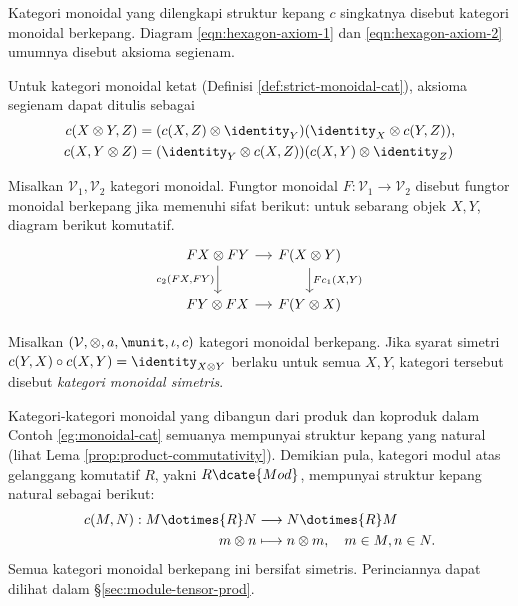 Kategori monoidal yang dilengkapi struktur kepang $c$ singkatnya disebut kategori monoidal berkepang. Diagram \eqref{eqn:hexagon-axiom-1} dan \eqref{eqn:hexagon-axiom-2} umumnya disebut aksioma segienam.
\begin{remark}\label{rem:hexagon-axiom-strict}
	Untuk kategori monoidal ketat (Definisi \ref{def:strict-monoidal-cat}), aksioma segienam dapat ditulis sebagai
	\begin{align*}
		c(X \otimes Y, Z) & = (c(X, Z) \otimes \identity_Y) (\identity_X \otimes c(Y, Z)), \\
		c(X, Y \otimes Z) & = (\identity_Y \otimes c(X, Z)) (c(X, Y) \otimes \identity_Z)
	\end{align*}
\end{remark}

\begin{definition}
	Misalkan $\mathcal{V}_1, \mathcal{V}_2$ kategori monoidal. Fungtor monoidal $F: \mathcal{V}_1 \to \mathcal{V}_2$ disebut fungtor monoidal berkepang jika memenuhi sifat berikut: untuk sebarang objek $X, Y$, diagram berikut komutatif.
	\[ \begin{tikzcd}[column sep=small]
		FX \otimes FY \arrow[r] \arrow[d, "{c_2(FX, FY)}"'] & F(X \otimes Y) \arrow[d, "{Fc_1(X, Y)}"] \\
		FY \otimes FX \arrow[r] & F(Y \otimes X)
	\end{tikzcd} \]
\end{definition}

\begin{definition}\label{def:symm-monoidal-cat}
	Misalkan $(\mathcal{V}, \otimes, a, \munit, \iota, c)$ kategori monoidal berkepang. Jika syarat simetri $c(Y,X) \circ c(X, Y) = \identity_{X \otimes Y}$ berlaku untuk semua $X, Y$, kategori tersebut disebut \emph{kategori monoidal simetris}.
\end{definition}

\begin{example}
	Kategori-kategori monoidal yang dibangun dari produk dan koproduk dalam Contoh \ref{eg:monoidal-cat} semuanya mempunyai struktur kepang yang natural (lihat Lema \ref{prop:product-commutativity}). Demikian pula, kategori modul atas gelanggang komutatif $R$, yakni $R\dcate{Mod}$, mempunyai struktur kepang natural sebagai berikut:
	\begin{align*}
		c(M, N): M \dotimes{R} N & \longrightarrow N \dotimes{R} M \\
		m \otimes n & \longmapsto n \otimes m, \quad m \in M, n \in N.
	\end{align*}
	Semua kategori monoidal berkepang ini bersifat simetris. Perinciannya dapat dilihat dalam \S\ref{sec:module-tensor-prod}.
\end{example}

